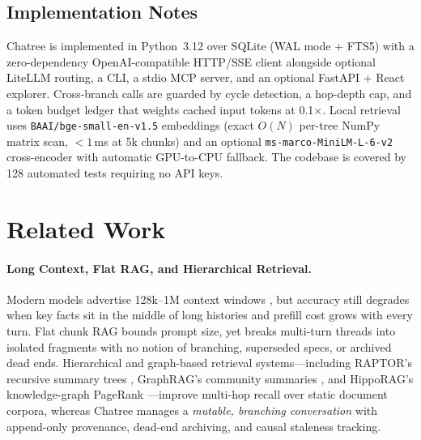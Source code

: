 \documentclass[10pt,twocolumn]{article}
\begin{document}
\subsection{Implementation Notes}
Chatree is implemented in Python~3.12 over SQLite (WAL mode + FTS5) with a zero-dependency OpenAI-compatible HTTP/SSE client alongside optional LiteLLM routing, a CLI, a stdio MCP server, and an optional FastAPI + React explorer. Cross-branch calls are guarded by cycle detection, a hop-depth cap, and a token budget ledger that weights cached input tokens at 0.1$\times$. Local retrieval uses \texttt{BAAI/bge-small-en-v1.5} embeddings (exact $O(N)$ per-tree NumPy matrix scan, $<1$\,ms at 5k chunks) and an optional \texttt{ms-marco-MiniLM-L-6-v2} cross-encoder with automatic GPU-to-CPU fallback. The codebase is covered by 128 automated tests requiring no API keys.

\section{Related Work}

\paragraph{Long Context, Flat RAG, and Hierarchical Retrieval.}
Modern models advertise 128k--1M context windows \citep{deepseek2024v3}, but accuracy still degrades when key facts sit in the middle of long histories \citep{liu2024lostinthemiddle} and prefill cost grows with every turn. Flat chunk RAG \citep{lewis2020rag,anthropic2024contextual} bounds prompt size, yet breaks multi-turn threads into isolated fragments with no notion of branching, superseded specs, or archived dead ends. Hierarchical and graph-based retrieval systems—including RAPTOR's recursive summary trees \citep{sarthi2024raptor}, GraphRAG's community summaries \citep{edge2024graphrag}, and HippoRAG's knowledge-graph PageRank \citep{gutierrez2024hipporag}—improve multi-hop recall over static document corpora, whereas Chatree manages a \emph{mutable, branching conversation} with append-only provenance, dead-end archiving, and causal staleness tracking.
\end{document}
